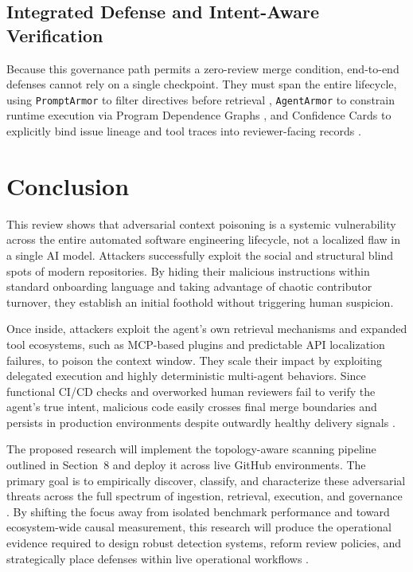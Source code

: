\documentclass[11pt, a4paper]{article}
\begin{document}
\subsection{\textbf{Integrated Defense and Intent-Aware Verification}}

Because this governance path permits a zero-review merge condition, end-to-end defenses cannot rely on a single checkpoint. They must span the entire lifecycle, using \texttt{PromptArmor} to filter directives before retrieval \citep{promptarmor_2025}, \texttt{AgentArmor} to constrain runtime execution via Program Dependence Graphs \citep{agentarmor_2025}, and Confidence Cards to explicitly bind issue lineage and tool traces into reviewer-facing records \citep{ai_teammates_2025,agentic_coding_github_2026}.

\endgroup
\clearpage
\section{\textbf{Conclusion}}

This review shows that adversarial context poisoning is a systemic vulnerability across the entire automated software engineering lifecycle, not a localized flaw in a single AI model. Attackers successfully exploit the social and structural blind spots of modern repositories. By hiding their malicious instructions within standard onboarding language and taking advantage of chaotic contributor turnover, they establish an initial foothold without triggering human suspicion. 

Once inside, attackers exploit the agent's own retrieval mechanisms and expanded tool ecosystems, such as MCP-based plugins and predictable API localization failures, to poison the context window. They scale their impact by exploiting delegated execution and highly deterministic multi-agent behaviors. Since functional CI/CD checks and overworked human reviewers fail to verify the agent's true intent, malicious code easily crosses final merge boundaries and persists in production environments despite outwardly healthy delivery signals \citep{good_first_issues_2020,pr_graph_topologies_2024,msr_user_ask_2023,autocoderover_2024,agentic_coding_github_2026,openhands_2025,trae_agent_2025,adv_bug_reports_2026,ai_teammates_2025}.

The proposed research will implement the topology-aware scanning pipeline outlined in Section~8 and deploy it across live GitHub environments. The primary goal is to empirically discover, classify, and characterize these adversarial threats across the full spectrum of ingestion, retrieval, execution, and governance \citep{agentic_coding_github_2026,pr_graph_topologies_2024,adv_bug_reports_2026}. By shifting the focus away from isolated benchmark performance and toward ecosystem-wide causal measurement, this research will produce the operational evidence required to design robust detection systems, reform review policies, and strategically place defenses within live operational workflows \citep{ai_teammates_2025,agentarmor_2025}.

\clearpage


\end{document}
